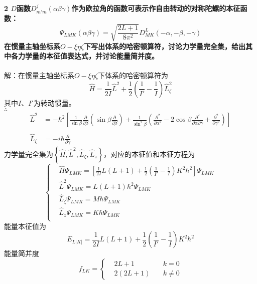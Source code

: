 \documentclass[12pt]{article}
\numberwithin{equation}{section}	 %
\begin{document}
\begin{spacing}{1.5}
\textbf{2 \quad $D$函数$\displaystyle D_{m'm}^{j}(\alpha\beta\gamma)$作为欧拉角的函数可表示作自由转动的对称陀螺的本征函数：
\begin{equation}\nonumber 		%
\Psi_{LMK}(\alpha\beta\gamma) = \sqrt{\frac{2L+1}{8\pi^{2}}}D_{MK}^{L}(-\alpha,-\beta,-\gamma)
\end{equation}
在惯量主轴坐标系$O-\xi\eta\zeta$下写出体系的哈密顿算符，讨论力学量完全集，给出其中各力学量的本征值表达式，并讨论能量简并度。}\\
~\\
解：在惯量主轴坐标系$O-\xi\eta\zeta$下体系的哈密顿算符为
\begin{equation}
\hat{H} = \frac{1}{2I}\hat{L}^{2} + \frac{1}{2}\left(\frac{1}{I'}-\frac{1}{I}\right)\hat{L}_{\zeta}^{2} 
\end{equation}
其中$I$、$I'$为转动惯量。\\
$\therefore$
\begin{align*}
\hat{L}^{2} &= -\hbar^{2} \left[ \frac{1}{\sin\beta}\frac{\partial}{\partial\beta}\left(\sin\beta\frac{\partial}{\partial\beta}\right) + \frac{1}{\sin^{2}\beta}\left( \frac{\partial^{2}}{\partial\alpha^{2}} - 2\cos\beta\frac{\partial^{2}}{\partial\alpha\partial\gamma} + \frac{\partial^{2}}{\partial\gamma^{2}} \right) \right] \\
~\\
\hat{L}_{\zeta} &= -i\hbar\frac{\partial}{\partial\gamma}
\end{align*}
力学量完全集为$\left\{\hat{H},\hat{L}^{2},\hat{L}_{\zeta},\hat{L}_{z}\right\}$，对应的本征值和本征方程为
\begin{equation}
\left\{		%
\begin{aligned}
&\hat{H}\Psi_{LMK} = \left[ \frac{1}{2I}L(L+1) +\frac{1}{2}\left(\frac{1}{I'}-\frac{1}{I}\right)K^{2}\hbar^{2} \right]\Psi_{LMK} \\
&\hat{L}^{2}\Psi_{LMK} = L(L+1)\hbar^{2}\Psi_{LMK} \\
&\hat{L}_{\zeta}\Psi_{LMK} = M\hbar\Psi_{LMK} \\
&\hat{L}_{z}\Psi_{LMK} = K\hbar\Psi_{LMK} \\
\end{aligned}
\right.	%
\end{equation}
能量本征值为
\begin{equation}
E_{L|K|} = \frac{1}{2I}L(L+1) +\frac{1}{2}\left(\frac{1}{I'}-\frac{1}{I}\right)K^{2}\hbar^{2}
\end{equation}
能量简并度
\begin{equation}
f_{LK}=
\left\{		%
\begin{aligned}
&2L+1 \quad &k=0 \\
&2(2L+1) \quad &k \ne 0
\end{aligned}
\right.	%
\end{equation}
~\\
~\\



\end{spacing}
\end{document}
